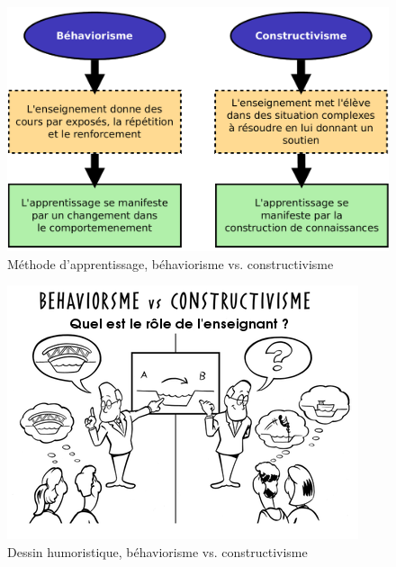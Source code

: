 \begin{figure}[H]
  \centering
  \includegraphics[width=\textwidth]{../resources/illustrations/behaviorisme_constructivisme}
  \caption{Méthode d'apprentissage, béhaviorisme vs. constructivisme}
  \label{fig:behaviorisme_vs_constructivisme_illu}
\end{figure}
\begin{figure}[H]
  \centering
  \includegraphics[width=\textwidth]{../resources/illustrations/behaviorisme_vs_constructivisme}
  \caption{Dessin humoristique, béhaviorisme vs. constructivisme}
  \label{fig:behaviorisme_vs_constructivisme_dessin}
\end{figure}

